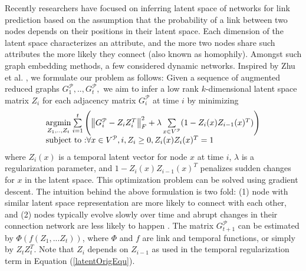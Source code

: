Recently researchers have focused on inferring latent space of networks for link prediction \cite{Zhu2016,ye2013predicting,qi2013link,dunlavy2011temporal,menon2011link} based on the assumption that the probability of a link between two nodes depends on their positions in their latent space. Each dimension of the latent space characterizes an attribute, and the more two nodes share such attributes the more likely they connect (also known as homophily). Amongst such graph embedding methods, a few  \cite{dunlavy2011temporal,Zhu2016} considered dynamic networks. Inspired by %
Zhu et al. \cite{Zhu2016}%
, we formulate our problem as follows: Given a sequence of augmented reduced graphs $G^\mathcal{P}_1, .., G^\mathcal{P}_t,$ we aim to infer a low rank $k$-dimensional latent space matrix $Z_i$ for each adjacency matrix $G^\mathcal{P}_i$ at time $i$ by minimizing 
\begin{equation}\label{latentOrigEqu}
    \begin{array}{l}
\operatorname*{argmin}\limits_{Z_1, .., Z_t}\sum\limits_{i=1}^{t}\left(\left \| G^\mathcal{P}_i-Z_{i}Z_{i}^T \right \|^2_F+\lambda \sum\limits_{x \in V^\mathcal{P}}(1-Z_{i}(x)Z_{i-1}(x)^T) \right)
\\
\text{subject to :} \forall x \in V^\mathcal{P},i,Z_{i}\geq 0, Z_{i}(x)Z_{i}(x)^T=1
    \end{array}
\end{equation}
where $Z_i(x)$ is a temporal latent vector for node $x$ at time $i$, %
$\lambda$ is a regularization parameter, and $1-Z_{i}(x)Z_{i-1}(x)^T$ penalizes sudden changes for $x$ in the latent space. This optimization problem can be solved using gradient descent. The intuition behind the above formulation is two fold: (1) node with similar latent space representation are more likely to connect with each other, and (2) nodes typically evolve slowly over time and abrupt changes in their connection network are less likely to happen \cite{zhang2014inferring}. 
The matrix $G^\mathcal{P}_{t+1}$ can be estimated by $\Phi(f(Z_1,...Z_t))$, where $\Phi$ and $f$ are link and temporal functions, or simply by $Z_tZ_t^T$. Note that $Z_i$ depends on $Z_{i-1}$ as used in the temporal regularization term in Equation (\ref{latentOrigEqu}).

